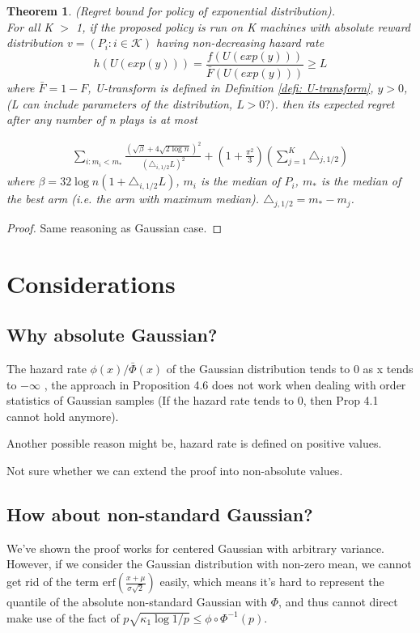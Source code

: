 \documentclass{article}
\theoremstyle{plain}
\newtheorem{theo}{Theorem}
\begin{document}
\begin{theo}
(Regret bound for policy of exponential distribution). \\

For all K $>$ 1, if the proposed policy is run on K machines with absolute reward distribution $v = (P_i: i \in \mathcal{K})$ having non-decreasing hazard rate $$h\left(U(exp(y))\right) = \frac{f\left(U(exp(y))\right)}{\bar{F}\left(U(exp(y))\right) } \geq L$$
where $\bar{F} = 1 - F$, U-transform is defined in Definition \ref{defi: U-transform}, $y > 0$, (L can include parameters of the distribution, $L > 0 ?)$.  then its expected regret after any number of n plays is at most 

\begin{align}
    \sum_{i: m_i < m_\ast} \frac{(\sqrt{\beta} + 4\sqrt{2\log n})^2}{ (\triangle_{i, 1/2} L)^2} + (1 + \frac{\pi^2}{3}) (\sum_{j=1}^K \triangle_{j, 1/2}) 
\end{align}
where $\beta = 32 \log n (1 + \triangle_{i, 1/2} L)$, $m_i$ is the median of $P_i$, $m_\ast$ is the median of the best arm (i.e. the arm with maximum median). $\triangle_{j, 1/2} = m_\ast - m_j$. 
\end{theo}

\begin{proof}
Same reasoning as Gaussian case. 
\end{proof}
\section{Considerations}

\subsection{Why absolute Gaussian?}

The hazard rate $\phi(x) / \bar{\Phi}(x)$ of the Gaussian distribution tends to 0 as x tends to $- \infty$ , the approach in  \cite{boucheron2012} Proposition 4.6 does not work when dealing with order statistics of Gaussian samples (If the hazard rate tends to 0, then Prop 4.1 cannot hold anymore).

Another possible reason might be, hazard rate is defined on positive values.

Not sure whether we can extend the proof into non-absolute values.

\subsection{How about non-standard Gaussian?}
We've shown the proof works for centered Gaussian with arbitrary variance. However, if we consider the Gaussian distribution with non-zero mean, we cannot get rid of the term $\text{erf}(\frac{x + \mu}{\sigma \sqrt{2}})$ easily, which means it's hard to represent the quantile of the absolute non-standard Gaussian with $\Phi$, and thus cannot direct make use of the fact of $p \sqrt{\kappa_{1} \log 1 / p} \leq \phi \circ \Phi^{-1}(p)$.
\end{document}
